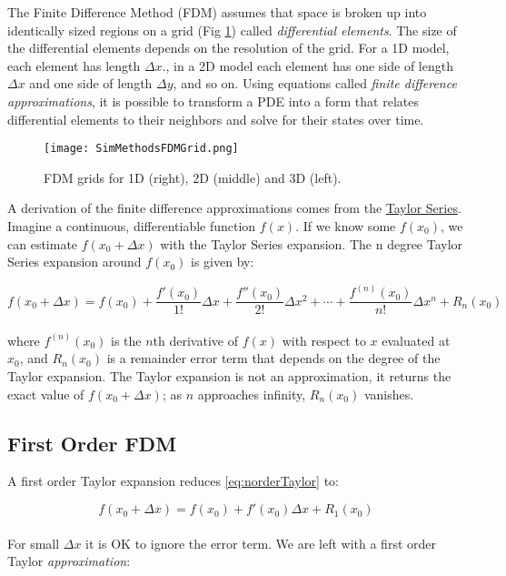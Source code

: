 {The Finite Difference Method (FDM) assumes that space is broken up into identically sized regions on a grid (Fig \ref{fig:FDMGrid}) called \textit{differential elements}.  The size of the differential elements depends on the resolution of the grid.  For a 1D model, each element has length $\Delta x$., in a 2D model each element has one side of length $\Delta x$ and one side of length $\Delta y$, and so on.  Using equations called \textit{finite difference approximations}, it is possible to transform a PDE into a form that relates differential elements to their neighbors and solve for their states over time.\\

\begin{figure}
  \texttt{[image: SimMethodsFDMGrid.png]}
  \caption{FDM grids for 1D (right), 2D (middle) and 3D (left).}
  \label{fig:FDMGrid}
\end{figure}

A derivation of the finite difference approximations comes from the \href{https://en.wikipedia.org/wiki/Taylor_series}{Taylor Series}.  Imagine a continuous, differentiable function $f(x)$.  If we know some $f(x_{0})$, we can estimate $f(x_{0}+\Delta  x)$ with the Taylor Series expansion.  The n degree Taylor Series expansion around $f(x_{0})$ is given by:

 \begin{equation}\label{eq:norderTaylor}
  f(x_{0} + \Delta  x) = f(x_{0}) + \frac{f'(x_{0})}{1!}\Delta  x + \frac{f''(x_{0})}{2!}\Delta  x^{2} + \cdots  + \frac{f^{(n)}(x_{0})}{n!}\Delta  x^{n} + R_{n}(x_{0})
  \end{equation}
    \\
  where $f^{(n)}(x_{0})$ is the $n$th derivative of $f(x)$ with respect to $x$ evaluated at $x_{0}$, and $R_{n}(x_{0})$ is a remainder error term that depends on the degree of the Taylor expansion.  The Taylor expansion is not an approximation, it returns the exact value of $ f(x_{0} + \Delta  x)$; as $n$ approaches infinity, $R_{n}(x_{0})$ vanishes.\\

\subsection{First Order FDM}

A first order Taylor expansion reduces \ref{eq:norderTaylor} to:
  
 \begin{equation}\label{eq:1degTaylor}
  f(x_{0} + \Delta  x) = f(x_{0}) + f'(x_{0})\Delta x + R_{1}(x_{0})
  \end{equation}
    \\
  For small $\Delta  x$ it is OK to ignore the error term.  We are left with a first order Taylor \textit{approximation}:
  
}
